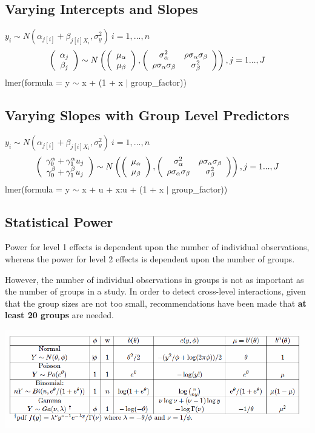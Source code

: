 \documentclass[10pt,landscape, fleqn]{article}
\begin{document}
\begin{multicols}{3}
			\subsection{Varying Intercepts and Slopes}
				$ y_i \sim N(\alpha_{j[i]}+\beta_{j[i]X_i}, \sigma_y^2)\ i=1,...,n $
				\[ \left( \begin{array}{c}
					\alpha_j \\ 
					\beta_j
				\end{array}\right) \sim 
				N \left(\left(\begin{array}{c} 
				\mu_\alpha \\ \mu_\beta
				\end{array} 
				\right), \left(\begin{array}{c c}
					\sigma^2_\alpha & \rho\sigma_\alpha\sigma_\beta \\ 
					\rho\sigma_\alpha\sigma_\beta & \sigma^2_\beta \\
				\end{array}\right)\right), j=1...,J \]	
				lmer(formula = y $\sim$ x + (1 + x $|$ group\_factor))
			\subsection{Varying Slopes with Group Level Predictors}
				$ y_i \sim N(\alpha_{j[i]}+\beta_{j[i]X_i}, \sigma_y^2)\ i=1,...,n $
				\[ \left( \begin{array}{c}
				\gamma_0^\alpha + \gamma_1^\alpha u_j \\ 
				\gamma_0^\beta + \gamma_1^\beta u_j 
				\end{array}\right) \sim 
				N \left(\left(\begin{array}{c} 
				\mu_\alpha \\ \mu_\beta
				\end{array} 
				\right), \left(\begin{array}{c c}
				\sigma^2_\alpha & \rho\sigma_\alpha\sigma_\beta \\ 
				\rho\sigma_\alpha\sigma_\beta & \sigma^2_\beta \\
				\end{array}\right)\right), j=1...,J \]	
				lmer(formula = y $\sim$ x + u + x:u + (1 + x $|$ group\_factor))
			\subsection{Statistical Power}
				Power for level 1 effects is dependent upon the number of individual observations, whereas the power for level 2 effects is dependent upon the number of groups. \par 
				However, the number of individual observations in groups is not as important as the number of groups in a study. In order to detect cross-level interactions, given that the group sizes are not too small, recommendations have been made that \textbf{at least 20 groups} are needed.
	\end{multicols}
	\begin{center}
	\includegraphics[width=0.7\linewidth]{glmdistribution}
	\end{center}
	
\end{document}
